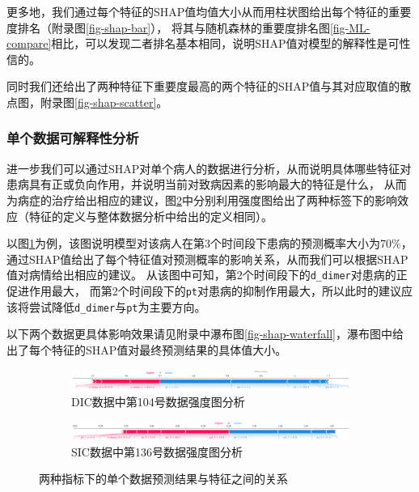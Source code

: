 \documentclass[12pt, a4paper, oneside]{ctexart}
\numberwithin{equation}{section}  %
\begin{document}
更多地，我们通过每个特征的SHAP值均值大小从而用柱状图给出每个特征的重要度排名（附录图\ref{fig-shap-bar}），
将其与随机森林的重要度排名图\ref{fig-ML-compare}相比，可以发现二者排名基本相同，说明SHAP值对模型的解释性是可性信的。

同时我们还给出了两种特征下重要度最高的两个特征的SHAP值与其对应取值的散点图，附录图\ref{fig-shap-scatter}。
\subsubsection{单个数据可解释性分析}
进一步我们可以通过SHAP对单个病人的数据进行分析，从而说明具体哪些特征对患病具有正或负向作用，并说明当前对致病因素的影响最大的特征是什么，
从而为病症的治疗给出相应的建议，图\ref{fig-shap-force}中分别利用强度图\cite{bib-shap-force}给出了两种标签下的影响效应（特征的定义与整体数据分析中给出的定义相同）。

以图\ref{fig-shap-dic-force}为例，该图说明模型对该病人在第3个时间段下患病的预测概率大小为$70\%$，
通过SHAP值给出了每个特征值对预测概率的影响关系，从而我们可以根据SHAP值对病情给出相应的建议。
从该图中可知，第2个时间段下的\texttt{d\_dimer}对患病的正促进作用最大，
而第2个时间段下的\texttt{pt}对患病的抑制作用最大，所以此时的建议应该将尝试降低\texttt{d\_dimer}与\texttt{pt}为主要方向。

以下两个数据更具体影响效果请见附录中瀑布图\ref{fig-shap-waterfall}，瀑布图中给出了每个特征的SHAP值对最终预测结果的具体值大小。
\begin{figure}[H]
   \begin{subfigure}[b]{1\textwidth}
       \hspace{-2.6cm}
       \includegraphics[scale=0.133]{SHAP/单个数据_shap_dic_force}
       \caption{DIC数据中第104号数据强度图分析}
       \label{fig-shap-dic-force}
   \end{subfigure}

   \bigskip
   \begin{subfigure}[b]{1\textwidth}
       \hspace{-2.6cm}
       \includegraphics[scale=0.133]{SHAP/单个数据_shap_sic_force}
       \caption{SIC数据中第136号数据强度图分析}
   \end{subfigure}
   \caption{两种指标下的单个数据预测结果与特征之间的关系}
   \label{fig-shap-force}
\end{figure}
\end{document}
